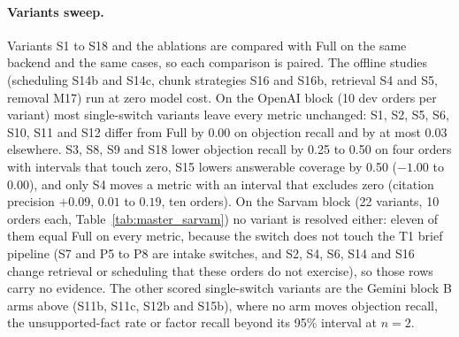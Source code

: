 \paragraph{Variants sweep.} Variants S1 to S18 and the ablations are compared with Full on the same backend and the same cases, so each comparison is paired. The offline studies (scheduling S14b and S14c, chunk strategies S16 and S16b, retrieval S4 and S5, removal M17) run at zero model cost. On the OpenAI block (10 dev orders per variant) most single-switch variants leave every metric unchanged: S1, S2, S5, S6, S10, S11 and S12 differ from Full by 0.00 on objection recall and by at most 0.03 elsewhere. S3, S8, S9 and S18 lower objection recall by 0.25 to 0.50 on four orders with intervals that touch zero, S15 lowers answerable coverage by 0.50 ($-1.00$ to $0.00$), and only S4 moves a metric with an interval that excludes zero (citation precision $+0.09$, $0.01$ to $0.19$, ten orders). On the Sarvam block (22 variants, 10 orders each, Table~\ref{tab:master_sarvam}) no variant is resolved either: eleven of them equal Full on every metric, because the switch does not touch the T1 brief pipeline (S7 and P5 to P8 are intake switches, and S2, S4, S6, S14 and S16 change retrieval or scheduling that these orders do not exercise), so those rows carry no evidence. The other scored single-switch variants are the Gemini block B arms above (S11b, S11c, S12b and S15b), where no arm moves objection recall, the unsupported-fact rate or factor recall beyond its 95\% interval at $n=2$.

